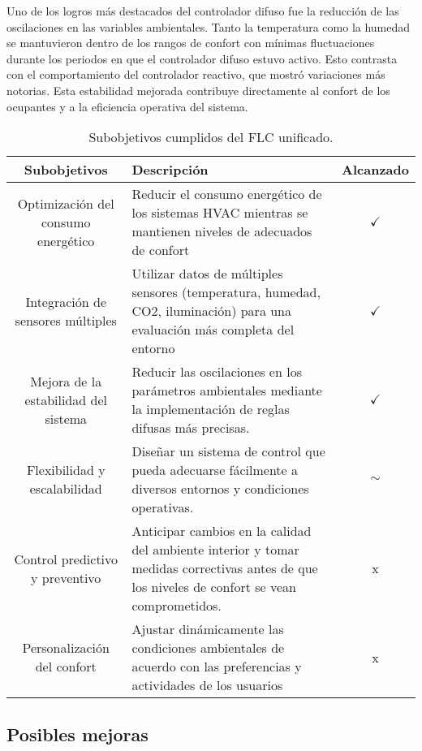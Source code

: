 Uno de los logros más destacados del controlador difuso fue la reducción de las oscilaciones en las variables ambientales. Tanto la temperatura como la humedad se mantuvieron dentro de los rangos de confort con mínimas fluctuaciones durante los periodos en que el controlador difuso estuvo activo. Esto contrasta con el comportamiento del controlador reactivo, que mostró variaciones más notorias. Esta estabilidad mejorada contribuye directamente al confort de los ocupantes y a la eficiencia operativa del sistema.

\begin{table}[H]
	\centering
	\begin{tabular}{| c | p{6.8cm} | c |}
		\hline
		\rowcolor{lightgray}
		\textbf{Subobjetivos} & \textbf{Descripción} & \textbf{Alcanzado} \\
		\hline
		Optimización del consumo energético & 
		Reducir el consumo energético de los sistemas HVAC mientras se mantienen niveles de adecuados de confort & $\checkmark$ \\
		\hline
		Integración de sensores múltiples & 
		Utilizar datos de múltiples sensores (temperatura, humedad, CO2, iluminación) para una evaluación más completa del entorno & $\checkmark$ \\
		\hline
		Mejora de la estabilidad del sistema & 
		Reducir las oscilaciones en los parámetros ambientales mediante la implementación de reglas difusas más precisas. & $\checkmark$ \\
		\hline
		Flexibilidad y escalabilidad & 
		Diseñar un sistema de control que pueda adecuarse fácilmente a diversos entornos y condiciones operativas. & $\sim$ \\
		\hline
		Control predictivo y preventivo & 
		Anticipar cambios en la calidad del ambiente interior y tomar medidas correctivas antes de que los niveles de confort se vean comprometidos. & x \\
		\hline
		Personalización del confort &
		Ajustar dinámicamente las condiciones ambientales de acuerdo con las preferencias y actividades de los usuarios & x \\
		\hline
	\end{tabular}
	\caption{Subobjetivos cumplidos del FLC unificado.}
	\label{tab:subobjetivos-cumplidos}
\end{table}

\subsection{Posibles mejoras}

